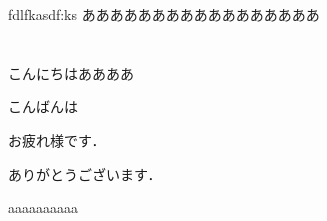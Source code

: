 \documentclass[dvipdfmx,report,11pt]{jsarticle}
\title{}
\author{funaki}
\date{\today}
\begin{document}
\newcommand{\ctext}[1]{\raise0.2ex\hbox{\textcircled{\scriptsize{#1}}}}
\maketitle

fdlfkasdf:ks
あああああああああああああああああ
\section{}
こんにちはああああ

こんばんは

お疲れ様です．

ありがとうございます．

aaaaaaaaaa
\end{document}
